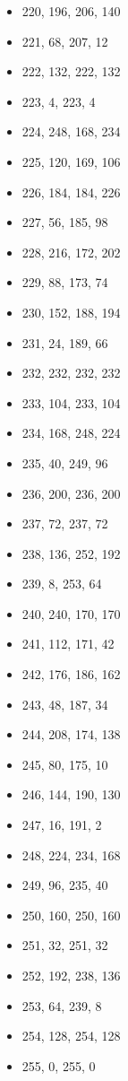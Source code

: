 \documentclass[12pt, fleqn]{report}                             %
\theoremstyle{break}                                            %
\begin{document}
\begin{multicols}{3}
\begin{itemize}
        \item 220, 196, 206, 140
        \item 221, 68, 207, 12
        \item 222, 132, 222, 132
        \item 223, 4, 223, 4
        \item 224, 248, 168, 234
        \item 225, 120, 169, 106
        \item 226, 184, 184, 226
        \item 227, 56, 185, 98
        \item 228, 216, 172, 202
        \item 229, 88, 173, 74
        \item 230, 152, 188, 194
        \item 231, 24, 189, 66
        \item 232, 232, 232, 232
        \item 233, 104, 233, 104
        \item 234, 168, 248, 224
        \item 235, 40, 249, 96
        \item 236, 200, 236, 200
        \item 237, 72, 237, 72
        \item 238, 136, 252, 192
        \item 239, 8, 253, 64
        \item 240, 240, 170, 170
        \item 241, 112, 171, 42
        \item 242, 176, 186, 162
        \item 243, 48, 187, 34
        \item 244, 208, 174, 138
        \item 245, 80, 175, 10
        \item 246, 144, 190, 130
        \item 247, 16, 191, 2
        \item 248, 224, 234, 168
        \item 249, 96, 235, 40
        \item 250, 160, 250, 160
        \item 251, 32, 251, 32
        \item 252, 192, 238, 136
        \item 253, 64, 239, 8
        \item 254, 128, 254, 128
        \item 255, 0, 255, 0
      \end{itemize}
      \end{multicols}
\end{document}
